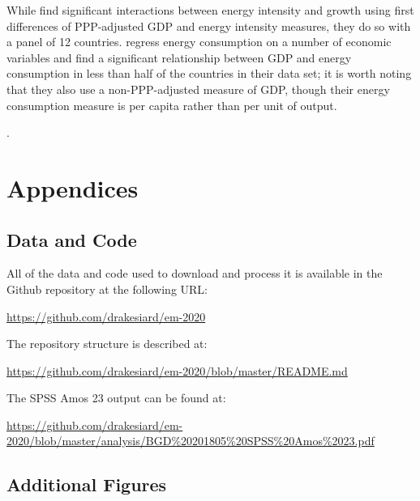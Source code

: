 \documentclass[11pt,a4paper]{article}
\begin{document}
While \cite{aydinDoesLevelEnergy2018} find significant interactions between energy intensity and growth using first differences of PPP-adjusted GDP and energy intensity measures, they do so with a panel of 12 countries.
\cite{tibaIncomeTradeOpenness2018} regress energy consumption on a number of economic variables and find a significant relationship between GDP and energy consumption in less than half of the countries in their data set; it is worth noting that they also use a non-PPP-adjusted measure of GDP, though their energy consumption measure is per capita rather than per unit of output.

\clearpage

\appendix

\renewcommand{\refname}{\section{References}}.


\clearpage

\section{Appendices}

\subsection{Data and Code}\label{sec:data_and_code}

All of the data and code used to download and process it is available in the Github repository at the following URL:

\url{https://github.com/drakesiard/em-2020}

\noindent
The repository structure is described at:

\url{https://github.com/drakesiard/em-2020/blob/master/README.md}

\noindent
The SPSS Amos 23 output can be found at:

\begin{adjustbox}{max width=\textwidth}
\url{https://github.com/drakesiard/em-2020/blob/master/analysis/BGD\%20201805\%20SPSS\%20Amos\%2023.pdf}
\end{adjustbox}

\subsection{Additional Figures}\label{sec:graph_appendix}
\end{document}
